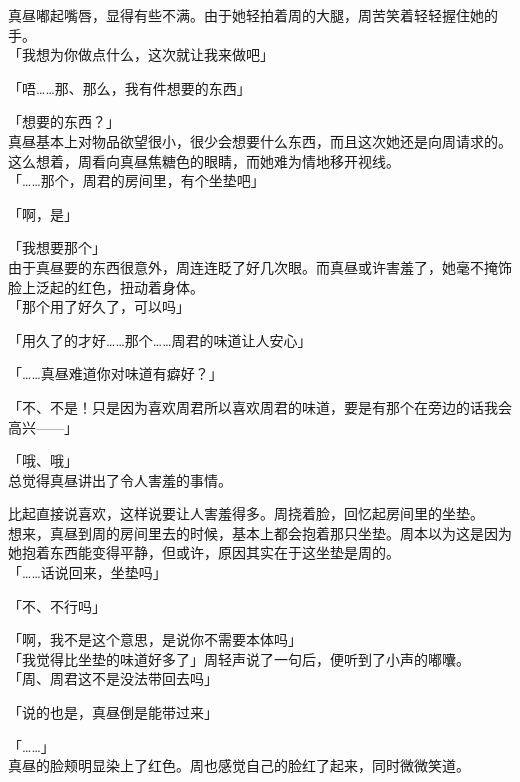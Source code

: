 真昼嘟起嘴唇，显得有些不满。由于她轻拍着周的大腿，周苦笑着轻轻握住她的手。\\

「我想为你做点什么，这次就让我来做吧」

「唔……那、那么，我有件想要的东西」

「想要的东西？」\\

真昼基本上对物品欲望很小，很少会想要什么东西，而且这次她还是向周请求的。这么想着，周看向真昼焦糖色的眼睛，而她难为情地移开视线。\\

「……那个，周君的房间里，有个坐垫吧」

「啊，是」

「我想要那个」\\

由于真昼要的东西很意外，周连连眨了好几次眼。而真昼或许害羞了，她毫不掩饰脸上泛起的红色，扭动着身体。\\

「那个用了好久了，可以吗」

「用久了的才好……那个……周君的味道让人安心」

「……真昼难道你对味道有癖好？」

「不、不是！只是因为喜欢周君所以喜欢周君的味道，要是有那个在旁边的话我会高兴——」

「哦、哦」\\

总觉得真昼讲出了令人害羞的事情。

比起直接说喜欢，这样说要让人害羞得多。周挠着脸，回忆起房间里的坐垫。\\

想来，真昼到周的房间里去的时候，基本上都会抱着那只坐垫。周本以为这是因为她抱着东西能变得平静，但或许，原因其实在于这坐垫是周的。\\

「……话说回来，坐垫吗」

「不、不行吗」

「啊，我不是这个意思，是说你不需要本体吗」\\

「我觉得比坐垫的味道好多了」周轻声说了一句后，便听到了小声的嘟囔。\\

「周、周君这不是没法带回去吗」

「说的也是，真昼倒是能带过来」

「……」\\

真昼的脸颊明显染上了红色。周也感觉自己的脸红了起来，同时微微笑道。\\

